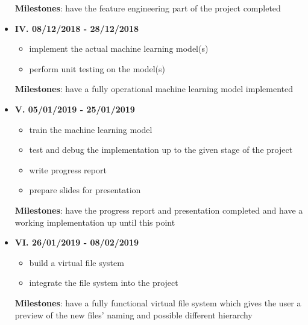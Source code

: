\begin{itemize}
\begin{itemize}
        \end{itemize}

        \textbf{Milestones}: have the feature engineering part of the project completed\\



  \item \textbf{IV. 08/12/2018 - 28/12/2018}

        \begin{itemize}
          \item implement the actual machine learning model(s)
          \item perform unit testing on the model(s)
        \end{itemize}

        \textbf{Milestones}: have a fully operational machine learning model implemented\\



  \item \textbf{V. 05/01/2019 - 25/01/2019}

        \begin{itemize}
          \item train the machine learning model
          \item test and debug the implementation up to the given stage of the project
          \item write progress report
          \item prepare slides for presentation
        \end{itemize}

        \textbf{Milestones}: have the progress report and presentation completed and have a working implementation up until this point\\


  \item \textbf{VI. 26/01/2019 - 08/02/2019}

        \begin{itemize}
          \item build a virtual file system
          \item integrate the file system into the project
        \end{itemize}

        \textbf{Milestones}: have a fully functional virtual file system which gives the user a preview of the new files' naming and possible different hierarchy\\




\end{itemize}
